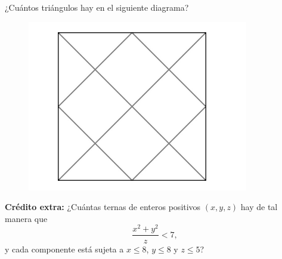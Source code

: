 \documentclass[10pt]{article}
\begin{document}
\begin{problema}
¿Cuántos triángulos hay en el siguiente diagrama?
\begin{figure}[h!]
    \centering
    \includegraphics[scale=0.3]{Imagenes/IMG1/tarea.png}
\end{figure}

\end{problema}

\textbf{Crédito extra:} ¿Cuántas ternas de enteros positivos $(x,y,z)$ hay de tal manera que
\[\frac{x^2+y^2}{z}< 7,\]
y cada componente está sujeta a $x\leq 8$, $y\leq 8$ y $z\leq 5$?
\end{document}
